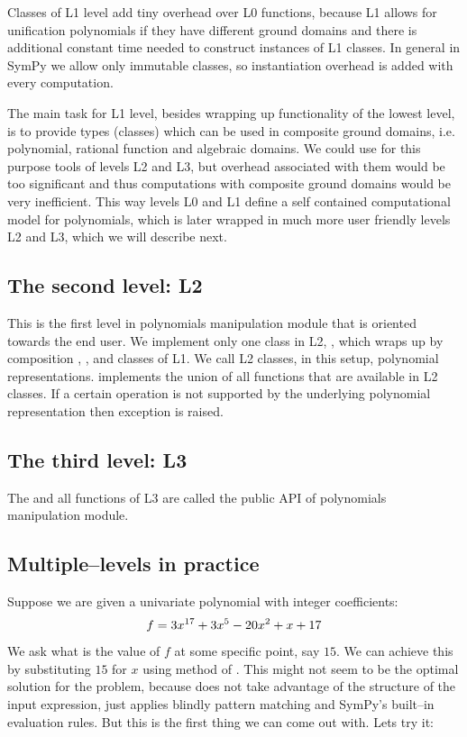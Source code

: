 Classes of L1 level add tiny overhead over L0 functions, because L1 allows for unification
polynomials if they have different ground domains and there is additional constant time
needed to construct instances of L1 classes. In general in SymPy we allow only immutable
classes, so instantiation overhead is added with every computation.

The main task for L1 level, besides wrapping up functionality of the lowest level, is to
provide types (classes) which can be used in composite ground domains, i.e. polynomial,
rational function and algebraic domains. We could use for this purpose tools of levels L2
and L3, but overhead associated with them would be too significant and thus computations
with composite ground domains would be very inefficient. This way levels L0 and L1 define
a self contained computational model for polynomials, which is later wrapped in much more
user friendly levels L2 and L3, which we will describe next.


\subsection{The second level: L2}

This is the first level in polynomials manipulation module that is oriented towards the end
user. We implement only one class in L2, , which wraps up by composition ,
,  and  classes of L1. We call L2 classes, in this setup, polynomial
representations.  implements the union of all functions that are available in L2
classes. If a certain operation is not supported by the underlying polynomial representation
then  exception is raised.


\subsection{The third level: L3}

The  and all functions of L3 are called the public API of polynomials manipulation
module.


\subsection{Multiple--levels in practice}

Suppose we are given a univariate polynomial with integer coefficients:
\begin{gather}
\begin{split}f = 3 x^{17} + 3 x^5 - 20 x^2 + x + 17\end{split}\notag
\end{gather}
We ask what is the value of $f$ at some specific point, say $15$. We can achieve this by
substituting $15$ for $x$ using  method of . This might not seem to
be the optimal solution for the problem, because  does not take advantage of
the structure of the input expression, just applies blindly pattern matching and SymPy's
built--in evaluation rules. But this is the first thing we can come out with. Lets try it:

